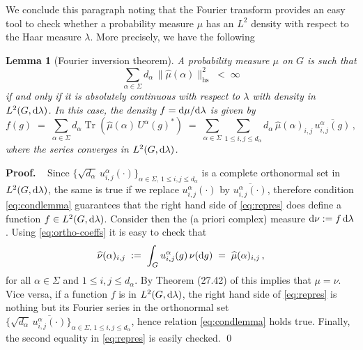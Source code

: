 \documentclass[a4paper,reqno,11pt]{amsart}
\numberwithin{equation}{section}
\newtheorem{lemma}[theorem]{Lemma}
\newcommand{\ga}{\alpha}
\newcommand{\gl}{\lambda}
\newcommand{\dd}{\text{\rm d}}             %
\def\proof{\noindent\textbf{Proof.} \ }
\DeclareMathOperator{\tr}{Tr}
\newcommand{\somb}{\widehat} %
\begin{document}
We conclude this paragraph noting that
the Fourier transform provides
an easy tool to check whether a probability measure
$\mu$ has an $L^2$ density with respect
to the Haar measure $\lambda$. More precisely, we have the following

\smallskip
\begin{lemma}[Fourier inversion theorem] \label{lem:Fourinv}
A probability measure $\mu$ on $G$ is such that
\begin{equation} \label{eq:condlemma}
	\sum_{\alpha \in \Sigma} d_\alpha \, \|\somb \mu(\alpha)\|_{\mathrm{hs}}^2 
	\;<\; \infty
\end{equation}
if and only if it is absolutely continuous with respect to $\lambda$ with density
in $L^2(G,\dd\lambda)$.
In this case, the density $f = \dd \mu/\dd \gl$ is given by
\begin{equation} \label{eq:repres}
	f(g)  \;=\; 
\sum_{\alpha\in\Sigma} d_\alpha \tr( \somb \mu(\alpha) \, U^\alpha(g)^* )
\;=\; \sum_{\alpha\in\Sigma} \sum_{1 \le i,j \le d_\ga}
d_\alpha \, \somb\mu(\alpha)_{i,j} \, 
\overline{u^\alpha_{i,j}(g)} \,,
\end{equation}
where the series converges in $L^2(G,\dd\gl)$.
\end{lemma}
\smallskip

\proof
Since $\{\sqrt{d_\alpha} \, u^\alpha_{i,j}(\cdot)\}_{\alpha \in \Sigma,\,
1 \le i,j \le d_\alpha}$ is a complete orthonormal set in $L^2(G, \dd\lambda)$,
the same is true if we replace
$u^\alpha_{i,j}(\cdot)$ by $\overline{u^\alpha_{i,j}(\cdot)}$,
therefore condition \eqref{eq:condlemma} guarantees that the right hand side
of \eqref{eq:repres} does define a function $f \in L^2(G,\dd \gl)$.
Consider then the (a priori complex) measure $\dd\nu := f \, \dd \gl$.
Using \eqref{eq:ortho-coeffs} it is easy to check that
\begin{equation}
	\somb \nu (\ga)_{i,j} \;:=\; \int_G u^\ga_{i,j}(g) \, \nu(\dd g)
	\;=\; \somb \mu(\ga)_{i,j}\,,
\end{equation}
for all $\ga \in \Sigma$ and $1 \le i,j \le d_\ga$.
By Theorem (27.42) of \cite{cf:Hewitt2} this implies that $\mu=\nu$.
Vice versa, if a function $f$ is in $L^2(G, \dd \gl)$,
the right hand side of \eqref{eq:repres} is nothing
but its Fourier series in the orthonormal set
$\{\sqrt{d_\alpha} \, \overline{u^\alpha_{i,j}(\cdot)}\}_{\alpha \in \Sigma,\,
1 \le i,j \le d_\alpha}$, hence relation \eqref{eq:condlemma} holds true.
Finally, the second equality in \eqref{eq:repres} is easily checked.
\qed
\smallskip
\end{document}

